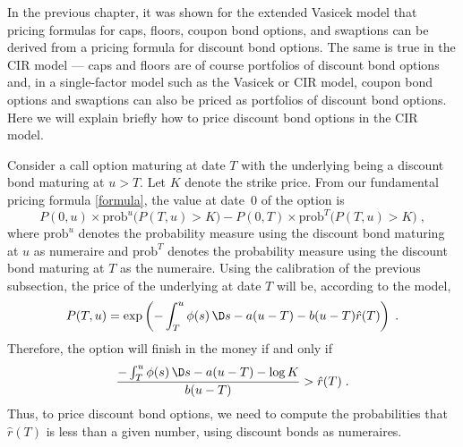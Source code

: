 In the previous chapter, it was shown for the extended Vasicek model that pricing formulas for caps, floors, coupon bond options, and swaptions can be derived from a pricing formula for discount bond options.  The same is true in the CIR model --- caps and floors are of course portfolios of discount bond options and, in a single-factor model such as the Vasicek or CIR model, coupon bond options and swaptions can also be priced as portfolios of discount bond options.  Here we will explain briefly how to price discount bond options in the CIR model.

Consider a call option maturing at date $T$ with the underlying being a discount bond maturing at $u>T$.  Let $K$ denote the strike price.  From our fundamental pricing formula \eqref{formula}, the value at date~0 of the option is
\begin{equation}\label{ciroptionprice}
P(0,u)\times\text{prob}^u\big(P(T,u)>K\big) - P(0,T)\times\text{prob}^T\big(P(T,u)>K\big)\;,
\end{equation}
where $\text{prob}^u$ denotes the probability measure using the discount bond maturing at $u$  as numeraire and $\text{prob}^T$ denotes the probability measure using the discount bond maturing at $T$ as the numeraire.  Using the calibration of the previous subsection, the price of the underlying at date $T$ will be, according to the model,
$$P(T,u)  = \exp\left(-\int_T^u \phi(s)\,\D s-a(u-T)-b(u-T)\hat{r}(T)\right)\; .$$
Therefore, the option will finish in the money if and only if
\begin{equation}\label{ciroptionprice2}
\frac{-\int_T^u \phi(s)\,\D s-a(u-T)-\log K}{b(u-T)} > \hat{r}(T)\;.
\end{equation}
Thus, to price discount bond options, we need to compute the probabilities that $\hat{r}(T)$ is less than a given number, using discount bonds as numeraires.  

